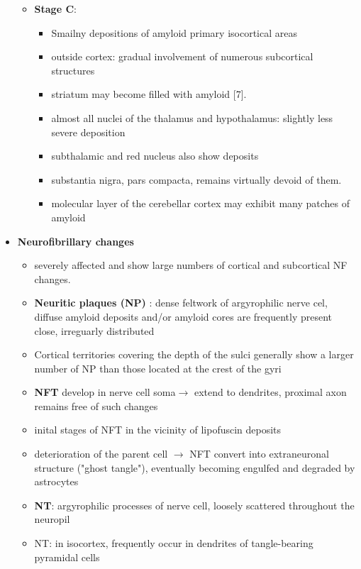 \documentclass[fleqn]{article}\usepackage{caption}
\begin{document}
\begin{itemize}
\begin{itemize}
\item \textbf{Stage C}: 
\begin{itemize}\item Smailny depositions of amyloid primary isocortical areas 
\item outside cortex:  gradual involvement of numerous subcortical structures
\item striatum may become filled with amyloid [7].
\item almost all nuclei of the thalamus and hypothalamus: slightly less severe deposition
\item subthalamic and red nucleus  also show deposits
\item substantia nigra, pars compacta, remains virtually devoid of them. 
\item molecular layer of the cerebellar cortex may exhibit many patches of amyloid
\end{itemize}
\end{itemize}

\item \textbf{Neurofibrillary changes}
\begin{itemize}
\item severely affected and show large numbers of cortical
and subcortical NF changes.
\item \textbf{Neuritic plaques (NP)} : dense feltwork of argyrophilic nerve cel,  diffuse amyloid deposits and/or amyloid cores are frequently present close, irreguarly distributed
\item  Cortical territories covering the depth of the sulci generally show a larger number of NP
than those located at the crest of the gyri

\item \textbf{NFT} develop in nerve cell soma$\rightarrow$ extend to dendrites, proximal axon remains free of such changes
\item inital stages of NFT in the vicinity of lipofuscin deposits
\item  deterioration of the parent cell $\rightarrow$ NFT convert into extraneuronal structure ("ghost tangle"), eventually
becoming engulfed and degraded by astrocytes


\item \textbf{NT}: argyrophilic processes of nerve cell, loosely scattered throughout the neuropil
\item NT: in isocortex,  frequently occur in dendrites of tangle-bearing pyramidal cells


\end{itemize}
\end{itemize}
\end{document}
